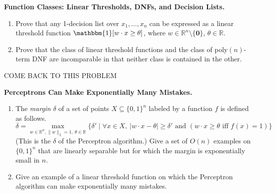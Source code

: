 \documentclass[11pt]{article}
\newcommand*{\R}{\mathbb{R}}
\DeclareMathOperator{\1}{\mathbbm{1}}
\begin{document}
\begin{problem} [15 points] \textbf{Function Classes: Linear Thresholds, DNFs, and Decision Lists.} \
	\begin{enumerate}[label=\alph*)]
		\item Prove that any 1-decision list over $x_1,\dots,x_n$ can be expressed as a linear threshold function $\1[w \cdot x \geq \theta]$, where $w \in \R^n\setminus\{\mathbf{0}\}$, $\theta \in \R$.
		\item Prove that the class of linear threshold functions and the class of
		poly$(n)$-term DNF are incomparable in that neither class is contained in the
		other.
	\end{enumerate}

COME BACK TO THIS PROBLEM
\end{problem}
\begin{problem}[15 points] \textbf{Perceptrons Can Make Exponentially Many Mistakes.}\
	\begin{enumerate}[label = \alph*)]
		\item The {\em margin} $\delta$ of a set of points $X \subseteq \{0,1\}^n$
		labeled by a function $f$ is defined as follows.  $$\delta = \max_{w \in
			\R^n, \|w\|_2 = 1,\ \theta \in \R} \{ \delta' \mid \forall x \in
		X,\ |w\cdot x - \theta| \geq \delta'  \text{ and }  (w \cdot x \geq \theta
		\text{ iff } f(x) = 1)  \}$$ (This is the $\delta$ of the
		Perceptron algorithm.) Give a set of $O(n)$ examples on $\{0,1\}^n$ that are
		linearly separable but for which the margin is exponentially small in $n$.
		\item Give an example of a linear threshold function on which the Perceptron algorithm can make exponentially many mistakes.
	\end{enumerate}


\end{problem}
\end{document}
